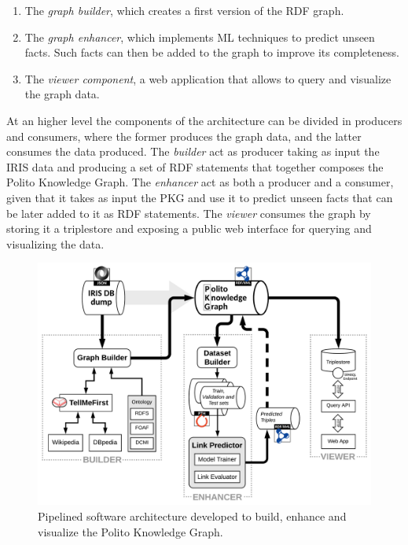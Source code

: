 \documentclass[%
    corpo=13.5pt,
    twoside,
    oldstyle,
    tipotesi=magistrale,
    greek,
    evenboxes
]{toptesi}
\begin{document}
\begin{enumerate}
    \item The \emph{graph builder}, which creates a first version of the
    RDF graph.
    \item The \emph{graph enhancer}, which implements ML techniques to predict
    unseen facts. Such facts can then be added to the graph to improve its
    completeness.
    \item The \emph{viewer component}, a web application that allows to query
    and visualize the graph data.
\end{enumerate}

At an higher level the components of the architecture can be divided in
producers and consumers, where the former produces the graph data, and the
latter consumes the data produced.
The \emph{builder} act as producer taking as input the IRIS data
and producing a set of RDF statements that together composes the
Polito Knowledge Graph.
The \emph{enhancer} act as both a producer and a consumer, given that it
takes as input the PKG and use it to predict unseen facts that can be
later added to it as RDF statements.
The \emph{viewer} consumes the graph by storing it a triplestore and exposing
a public web interface for querying and visualizing the data.


\begin{figure}[h]
    \centering
    \includegraphics[scale=0.8]{img/pipeline_white-bg.png}
    \caption{Pipelined software architecture developed to build,
    enhance and visualize the Polito Knowledge Graph.}
    \label{fig:pipeline}
\end{figure}
\end{document}

